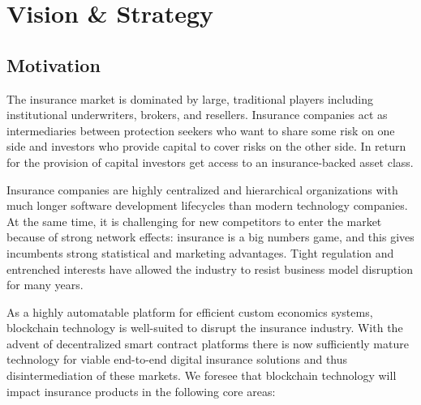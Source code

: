 \documentclass[12pt]{article}
\begin{document}

\section{Vision \& Strategy}

\subsection{Motivation}

The insurance market is dominated by large, traditional players including institutional underwriters, brokers, and resellers. Insurance companies act as intermediaries between protection seekers who want to share some risk on one side and investors who provide capital to cover risks on the other side. In return for the provision of capital investors get access to an insurance-backed asset class.

Insurance companies are highly centralized and hierarchical organizations with much longer software development lifecycles than modern technology companies. At the same time, it is challenging for new competitors to enter the market because of strong network effects: insurance is a big numbers game, and this gives incumbents strong statistical and marketing advantages. Tight regulation and entrenched interests have allowed the industry to resist business model disruption for many years.

As a highly automatable platform for efficient custom economics systems, blockchain technology is well-suited to disrupt the insurance industry. With the advent of decentralized smart contract platforms there is now sufficiently mature technology for viable end-to-end digital insurance solutions and thus disintermediation of these markets. We foresee that blockchain technology will impact insurance products in the following core areas:
\end{document}
